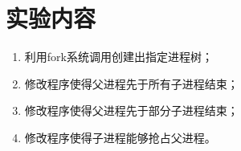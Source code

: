\section{实验内容}
\begin{enumerate}
    \item 利用fork系统调用创建出指定进程树；
    \item 修改程序使得父进程先于所有子进程结束；
    \item 修改程序使得父进程先于部分子进程结束；
    \item 修改程序使得子进程能够抢占父进程。
\end{enumerate}